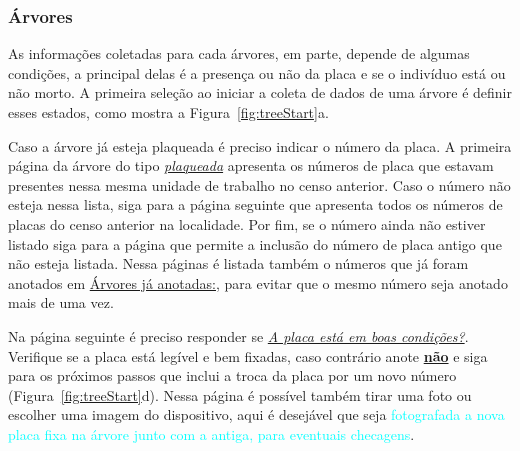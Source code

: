 \documentclass[12pt, a4paper]{article} %
\begin{document}



\subsubsection{Árvores}
\label{sec:arvores}


As informações coletadas para cada árvores, em parte, depende de algumas condições, a principal delas é a presença ou não da placa e se o indivíduo está ou não morto. A primeira seleção ao iniciar a coleta de dados de uma árvore é definir esses estados, como mostra a Figura~\ref{fig:treeStart}a.

Caso a árvore já esteja plaqueada é preciso indicar o número da placa. A primeira página da árvore do tipo \underline{\textit{plaqueada}} apresenta os números de placa que estavam presentes nessa mesma unidade de trabalho no censo anterior. Caso o número não esteja nessa lista, siga para a página seguinte que apresenta todos os números de placas do censo anterior na localidade. Por fim, se o número ainda não estiver listado siga para a página que permite a inclusão do número de placa antigo que não esteja listada.  Nessa páginas é listada também o números que já foram anotados em {\underline{Árvores já anotadas:}}, para evitar que o mesmo número seja anotado mais de uma vez. 

Na página seguinte é preciso responder se \textit{\underline{A placa está em boas condições?}}. Verifique se a placa está legível e bem fixadas, caso contrário anote \textbf{\underline{não}} e siga para os próximos passos que inclui a  troca da placa por um novo número (Figura~\ref{fig:treeStart}d).
Nessa página é possível também tirar uma foto ou escolher uma imagem do dispositivo, aqui é desejável que seja \textcolor{Cyan}{fotografada a nova placa fixa na árvore junto com a antiga, para eventuais checagens}.
\end{document}
